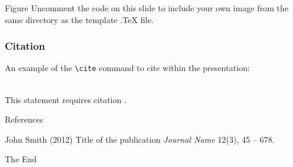 \documentclass[aspectratio=169,xcolor=dvipsnames]{beamer}
\begin{document}

\begin{frame}{Figure}
    Uncomment the code on this slide to include your own image from the same directory as the template .TeX file.
\end{frame}


\begin{frame}[fragile] %
    \frametitle{Citation}
    An example of the \verb|\cite| command to cite within the presentation:\\~

    This statement requires citation \cite{p1}.
\end{frame}


\begin{frame}{References}
    \footnotesize{
        \begin{thebibliography}{99}
             John Smith (2012)
            \newblock Title of the publication
            \newblock \emph{Journal Name} 12(3), 45 -- 678.
        \end{thebibliography}
    }
\end{frame}


\begin{frame}
    \Huge{\centerline{The End}}
\end{frame}

\end{document}
